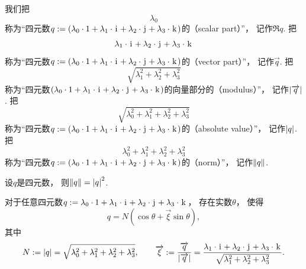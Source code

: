 我们把\begin{equation*}
	\lambda_0
\end{equation*}
称为“四元数\(
	q
	:=
	(
		\lambda_0 \cdot 1
		+ \lambda_1 \cdot \kern1pt\mathrm{i}\kern1pt
		+ \lambda_2 \cdot \kern1pt\mathrm{j}\kern1pt
		+ \lambda_3 \cdot \kern1pt\mathrm{k}\kern1pt
	)
\)的（scalar part）”，
记作\(\Re q\).
把\begin{equation*}
	\lambda_1 \cdot \kern1pt\mathrm{i}\kern1pt
	+ \lambda_2 \cdot \kern1pt\mathrm{j}\kern1pt
	+ \lambda_3 \cdot \kern1pt\mathrm{k}\kern1pt
\end{equation*}
称为“四元数\(
	q
	:=
	(
		\lambda_0 \cdot 1
		+ \lambda_1 \cdot \kern1pt\mathrm{i}\kern1pt
		+ \lambda_2 \cdot \kern1pt\mathrm{j}\kern1pt
		+ \lambda_3 \cdot \kern1pt\mathrm{k}\kern1pt
	)
\)的（vector part）”，
记作\(\vec{q}\).
把\begin{equation*}
	\sqrt{
		\lambda_1^2
		+ \lambda_2^2
		+ \lambda_3^2
	}
\end{equation*}
称为“四元数\(
	(
		\lambda_0 \cdot 1
		+ \lambda_1 \cdot \kern1pt\mathrm{i}\kern1pt
		+ \lambda_2 \cdot \kern1pt\mathrm{j}\kern1pt
		+ \lambda_3 \cdot \kern1pt\mathrm{k}\kern1pt
	)
\)的向量部分的（modulus）”，
记作\(\abs{\overrightarrow{q}}\).
把\begin{equation*}
	\sqrt{
		\lambda_0^2
		+ \lambda_1^2
		+ \lambda_2^2
		+ \lambda_3^2
	}
\end{equation*}
称为“四元数\(
	q
	:=
	(
		\lambda_0 \cdot 1
		+ \lambda_1 \cdot \kern1pt\mathrm{i}\kern1pt
		+ \lambda_2 \cdot \kern1pt\mathrm{j}\kern1pt
		+ \lambda_3 \cdot \kern1pt\mathrm{k}\kern1pt
	)
\)的（absolute value）”，
记作\(\abs{q}\).
把\begin{equation*}
	\lambda_0^2
	+ \lambda_1^2
	+ \lambda_2^2
	+ \lambda_3^2
\end{equation*}
称为“四元数\(
	q
	:=
	(
		\lambda_0 \cdot 1
		+ \lambda_1 \cdot \kern1pt\mathrm{i}\kern1pt
		+ \lambda_2 \cdot \kern1pt\mathrm{j}\kern1pt
		+ \lambda_3 \cdot \kern1pt\mathrm{k}\kern1pt
	)
\)的（norm）”，
记作\(\norm{q}\).

\begin{property}
设\(q\)是四元数，
则\(\norm{q} = \abs{q}^2\).
\end{property}

\begin{theorem}
对于任意四元数\(
	q
	:=
	\lambda_0 \cdot 1
	+ \lambda_1 \cdot \kern1pt\mathrm{i}\kern1pt
	+ \lambda_2 \cdot \kern1pt\mathrm{j}\kern1pt
	+ \lambda_3 \cdot \kern1pt\mathrm{k}\kern1pt
\)，
存在实数\(\theta\)，
使得\begin{equation*}
	q = N (\cos\theta + \vec{\xi} \sin\theta),
\end{equation*}
其中\begin{equation*}
	N
	:=
	\abs{q}
	=
	\sqrt{
		\lambda_0^2
		+ \lambda_1^2
		+ \lambda_2^2
		+ \lambda_3^2
	},
	\qquad
	\overrightarrow{\xi}
	:=
	\frac{ \overrightarrow{q} }{ \abs{\overrightarrow{q}} }
	=
	\frac{
		\lambda_1 \cdot \kern1pt\mathrm{i}\kern1pt
		+ \lambda_2 \cdot \kern1pt\mathrm{j}\kern1pt
		+ \lambda_3 \cdot \kern1pt\mathrm{k}\kern1pt
	}{
		\sqrt{
			\lambda_1^2
			+ \lambda_2^2
			+ \lambda_3^2
		}
	}.
\end{equation*}
\end{theorem}

